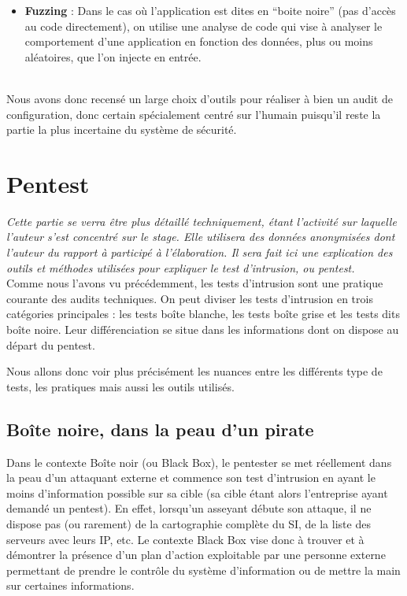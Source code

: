 \documentclass[a4paper]{memoir}
\begin{document}
\begin{itemize}
\item \textbf{Fuzzing} : Dans le cas où l'application est dites en ``boite noire'' (pas d'accès au code directement), on utilise une analyse de code qui vise à analyser le comportement d'une application en fonction des données, plus ou moins aléatoires, que l'on injecte en entrée.\\\\
  
\end{itemize}

Nous avons donc recensé un large choix d'outils pour réaliser à bien un audit de configuration, donc certain spécialement centré sur l'humain puisqu'il reste la partie la plus incertaine du système de sécurité.\\
  
\chapter{Pentest}

\textit{Cette partie se verra être plus détaillé techniquement, étant l'activité sur laquelle l'auteur s'est concentré sur le stage. Elle utilisera des données anonymisées dont l'auteur du rapport à participé à l'élaboration. Il sera fait ici une explication des outils et méthodes utilisées pour expliquer le test d'intrusion, ou pentest.}\\

Comme nous l'avons vu précédemment, les tests d'intrusion sont une pratique courante des audits techniques. On peut diviser les tests d'intrusion en trois catégories principales : les tests boîte blanche, les tests boîte grise et les tests dits boîte noire. Leur différenciation se situe dans les informations dont on dispose au départ du pentest. 

Nous allons donc voir plus précisément les nuances entre les différents type de tests, les pratiques mais aussi les outils utilisés.

\section{Boîte noire, dans la peau d'un pirate}

Dans le contexte Boîte noir (ou Black Box), le pentester se met réellement dans la peau d’un attaquant externe et commence son test d’intrusion en ayant le moins d’information possible sur sa cible (sa cible étant alors l’entreprise ayant demandé un pentest). En effet, lorsqu’un asseyant débute son attaque, il ne dispose pas (ou rarement) de la cartographie complète du SI, de la liste des serveurs avec leurs IP, etc. Le contexte Black Box vise donc à trouver et à démontrer la présence d’un plan d’action exploitable par une personne externe permettant de prendre le contrôle du système d’information ou de mettre la main sur certaines informations.
\end{document}
